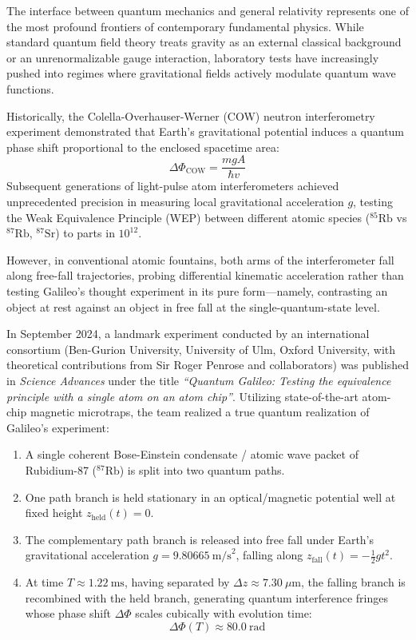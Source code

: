 \documentclass[11pt,a4paper]{article}
\begin{document}
The interface between quantum mechanics and general relativity represents one of the most profound frontiers of contemporary fundamental physics. While standard quantum field theory treats gravity as an external classical background or an unrenormalizable gauge interaction, laboratory tests have increasingly pushed into regimes where gravitational fields actively modulate quantum wave functions.

Historically, the Colella-Overhauser-Werner (COW) neutron interferometry experiment demonstrated that Earth's gravitational potential induces a quantum phase shift proportional to the enclosed spacetime area:
\begin{equation}
\Delta\Phi_{\mathrm{COW}} = \frac{m g A}{\hbar v}
\end{equation}
Subsequent generations of light-pulse atom interferometers achieved unprecedented precision in measuring local gravitational acceleration $g$, testing the Weak Equivalence Principle (WEP) between different atomic species ($^{85}\mathrm{Rb}$ vs $^{87}\mathrm{Rb}$, $^{87}\mathrm{Sr}$) to parts in $10^{12}$.

However, in conventional atomic fountains, both arms of the interferometer fall along free-fall trajectories, probing differential kinematic acceleration rather than testing Galileo's thought experiment in its pure form—namely, contrasting an object at rest against an object in free fall at the single-quantum-state level.

In September 2024, a landmark experiment conducted by an international consortium (Ben-Gurion University, University of Ulm, Oxford University, with theoretical contributions from Sir Roger Penrose and collaborators) was published in \textit{Science Advances} under the title \textit{``Quantum Galileo: Testing the equivalence principle with a single atom on an atom chip''}. Utilizing state-of-the-art atom-chip magnetic microtraps, the team realized a true quantum realization of Galileo's experiment:
\begin{enumerate}
    \item A single coherent Bose-Einstein condensate / atomic wave packet of Rubidium-87 ($^{87}\mathrm{Rb}$) is split into two quantum paths.
    \item One path branch is held stationary in an optical/magnetic potential well at fixed height $z_{\mathrm{held}}(t) = 0$.
    \item The complementary path branch is released into free fall under Earth's gravitational acceleration $g = 9.80665\ \mathrm{m/s}^2$, falling along $z_{\mathrm{fall}}(t) = -\frac{1}{2}g t^2$.
    \item At time $T \approx 1.22\ \mathrm{ms}$, having separated by $\Delta z \approx 7.30\ \mu\mathrm{m}$, the falling branch is recombined with the held branch, generating quantum interference fringes whose phase shift $\Delta\Phi$ scales cubically with evolution time:
    \begin{equation}
    \Delta\Phi(T) \approx 80.0\ \mathrm{rad}
    \end{equation}
\end{enumerate}
\end{document}
